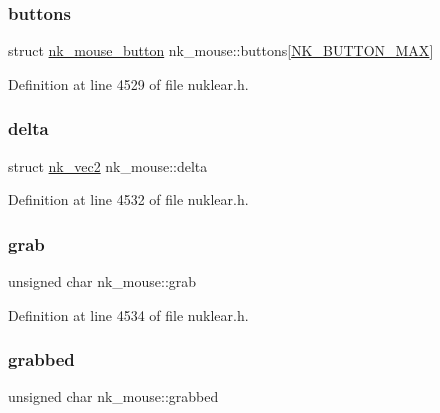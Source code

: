 \subsubsection{\texorpdfstring{buttons}{buttons}}
{\footnotesize\ttfamily struct \mbox{\hyperlink{structnk__mouse__button}{nk\+\_\+mouse\+\_\+button}} nk\+\_\+mouse\+::buttons\mbox{[}\mbox{\hyperlink{nuklear_8h_a393c070a7578ce148c1d341d412d556eaac3699df21301900b13e7408b75be8dd}{N\+K\+\_\+\+B\+U\+T\+T\+O\+N\+\_\+\+M\+AX}}\mbox{]}}



Definition at line 4529 of file nuklear.\+h.

\mbox{\label{structnk__mouse_ad51017f1b2ab199b892e454ec8f6e970}} 
\subsubsection{\texorpdfstring{delta}{delta}}
{\footnotesize\ttfamily struct \mbox{\hyperlink{structnk__vec2}{nk\+\_\+vec2}} nk\+\_\+mouse\+::delta}



Definition at line 4532 of file nuklear.\+h.

\mbox{\label{structnk__mouse_a93b114f1d129ce336d0d237980337ac9}} 
\subsubsection{\texorpdfstring{grab}{grab}}
{\footnotesize\ttfamily unsigned char nk\+\_\+mouse\+::grab}



Definition at line 4534 of file nuklear.\+h.

\mbox{\label{structnk__mouse_a498f60d6bf88ca50aacbddcb2a2032ad}} 
\subsubsection{\texorpdfstring{grabbed}{grabbed}}
{\footnotesize\ttfamily unsigned char nk\+\_\+mouse\+::grabbed}



